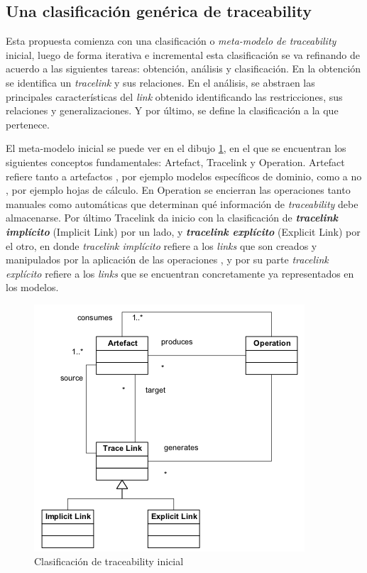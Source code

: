 \documentclass[a4paper,12pt,oneside,spanish]{book}
\begin{document}
\subsection{Una clasificación genérica de traceability}
\label{sec:ClasificacionTraceability}


Esta propuesta comienza con una clasificación o \textit{meta-modelo de traceability} inicial, luego de forma iterativa e incremental esta clasificación se va refinando de acuerdo a las siguientes tareas: obtención, análisis y clasificación. En la obtención se identifica un \textit{tracelink} y sus relaciones. En el análisis, se abstraen las principales características del \textit{link} obtenido identificando las restricciones, sus relaciones y generalizaciones. Y por último, se define la clasificación a la que pertenece.

El meta-modelo inicial se puede ver en el dibujo \ref{fig:ClasifInicial}, en el que se encuentran los siguientes conceptos fundamentales: \textsf{Artefact}, \textsf{Tracelink} y \textsf{Operation}. \textsf{Artefact} refiere tanto a artefactos , por ejemplo modelos específicos de dominio, como a no , por ejemplo hojas de cálculo. En \textsf{Operation} se encierran las operaciones tanto manuales como automáticas que determinan qué información de \textit{traceability} debe almacenarse. Por último \textsf{Tracelink} da inicio con la clasificación de \textit{\textbf{tracelink implícito}} (\textsf{Implicit Link}) por un lado, y \textit{\textbf{tracelink explícito}} (\textsf{Explicit Link}) por el otro, en donde \textit{tracelink implícito} refiere a los \textit{links} que son creados y manipulados por la aplicación de las operaciones , y por su parte \textit{tracelink explícito} refiere a los \textit{links} que se encuentran concretamente ya representados en los modelos.


\begin{figure}[hbtp]
\centering
\includegraphics[scale=1.05]{./img/ExplicitImplicitTraceLinkClassification}
\caption{Clasificación de traceability inicial}
\label{fig:ClasifInicial}
\end{figure}
\end{document}
